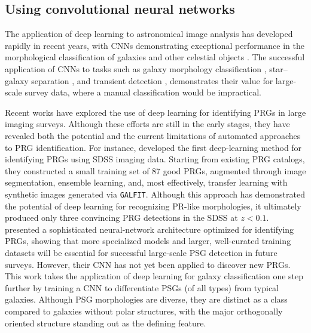 \documentclass{aa}
\begin{document}
\subsection{Using convolutional neural networks}\label{subsec:cnn}

The application of deep learning to astronomical image analysis has developed rapidly in recent years, with CNNs demonstrating exceptional performance in the morphological classification of galaxies and other celestial objects \citep{2019Ap&SS.364...55Z,2021MNRAS.506..659C,2022MNRAS.513.1581W,2024A&A...683A..42C}. The successful application of CNNs to tasks such as galaxy morphology classification \citep{2019MNRAS.484...93D,2022MNRAS.509.3966W}, star–galaxy separation \citep{2017MNRAS.464.4463K,2024RAA....24i5012Z}, and transient detection \citep{2019MNRAS.489.3582D,2025ApJ...987..105K}, demonstrates their value for large-scale survey data, where a manual classification would be impractical.

Recent works have explored the use of deep learning for identifying PRGs in large imaging surveys. Although these efforts are still in the early stages, they have revealed both the potential and the current limitations of automated approaches to PRG identification. For instance, \citet{2025A&A...702A.258D} developed the first deep-learning method for identifying PRGs using SDSS imaging data. Starting from existing PRG catalogs, they constructed a small training set of 87 good PRGs, augmented through image segmentation, ensemble learning, and, most effectively, transfer learning with synthetic images generated via \texttt{GALFIT}. Although this approach has demonstrated the potential of deep learning for recognizing PR-like morphologies, it ultimately produced only three convincing PRG detections in the SDSS at $z < 0.1$. \citet{2025RASTI...4af043K} presented a sophisticated neural-network architecture optimized for identifying PRGs, showing that more specialized models and larger, well-curated training datasets will be essential for successful large-scale PSG detection in future surveys. However, their CNN has not yet been applied to discover new PRGs. This work takes the application of deep learning for galaxy classification one step further by training a CNN to differentiate PSGs (of all types) from typical galaxies. Although PSG morphologies are diverse, they are distinct as a class compared to galaxies without polar structures, with the major orthogonally oriented structure standing out as the defining feature.
\end{document}
